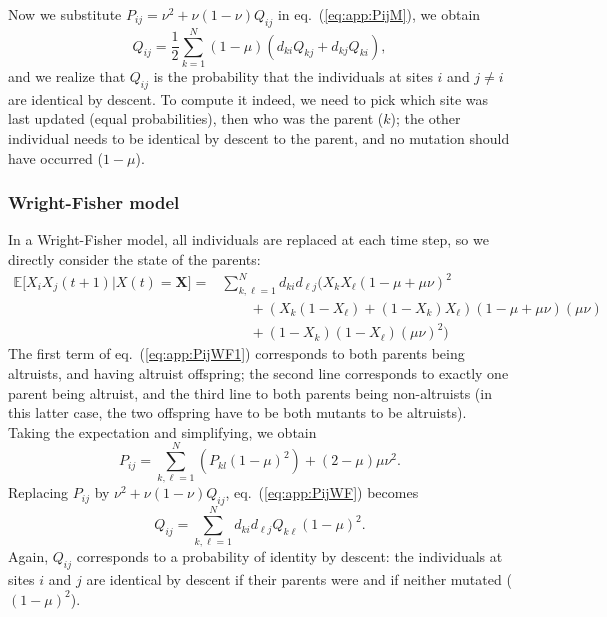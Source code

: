 \documentclass[11pt, letterpaper]{article}
\renewcommand{\eqref}[1]{\textup{{\normalfont eq.~(\ref{#1}}\normalfont)}}
\newcommand{\Esp}[1]{\mathbb{E}\big[ #1\big]}%
\newcommand{\mutbias}{\nu}
\begin{document}
Now we substitute $P_{ij} = \mutbias^2 + \mutbias (1-\mutbias) Q_{ij}$ in \eqref{eq:app:PijM}, we obtain
\begin{equation}\label{eq:app:QijM}
Q_{ij} = \frac{1}{2} \sum_{k=1}^N (1-\mu) \left( d_{ki} Q_{kj} + d_{kj} Q_{ki}\right),
\end{equation}
and we realize that $Q_{ij}$ is the probability that the individuals at sites $i$ and $j \neq i$ are identical by descent. To compute it indeed, we need to pick which site was last updated (equal probabilities), then who was the parent ($k$); the other individual needs to be identical by descent to the parent, and no mutation should have occurred ($1-\mu$). 

\subsubsection{Wright-Fisher model}

In a Wright-Fisher model, all individuals are replaced at each time step, so we directly consider the state of the parents:
\begin{align}\label{eq:app:PijWF1}
 \Esp{X_iX_j(t+1)|X(t)=\mathbf{X}} = & \sum_{k, \ell = 1}^N  d_{ki} d_{\ell j} \Bigg( X_k X_{\ell} (1-\mu+\mu \mutbias)^2 \nonumber\\ & \qquad + \left( X_k (1-X_{\ell}) + (1-X_k) X_{\ell} \right) (1-\mu+\mu \mutbias) (\mu \mutbias) \nonumber\\
 & \qquad + (1-X_k)(1-X_{\ell}) (\mu \mutbias)^2 \Bigg)
\end{align}
The first term of \eqref{eq:app:PijWF1} corresponds to both parents being altruists, and having altruist offspring; the second line corresponds to exactly one parent being altruist, and the third line to both parents being non-altruists (in this latter case, the two offspring have to be both mutants to be altruists). \\
Taking the expectation and simplifying, we obtain
\begin{equation}\label{eq:app:PijWF}
P_{ij} = \sum_{k, \ell = 1}^N \left( P_{kl} (1-\mu)^2  \right)+ (2-\mu)\mu \mutbias^2. 
\end{equation}
Replacing $P_{ij}$ by $\mutbias^2 + \mutbias (1-\mutbias) Q_{ij}$, \eqref{eq:app:PijWF} becomes
\begin{equation}\label{eq:app:QijWF}
Q_{ij} = \sum_{k, \ell=1}^N d_{ki} d_{\ell j} Q_{k\ell} (1-\mu)^2. 
\end{equation}
Again, $Q_{ij}$ corresponds to a probability of identity by descent: the individuals at sites $i$ and $j$ are identical by descent if their parents were and if neither mutated ($(1-\mu)^2$). 
\end{document}
